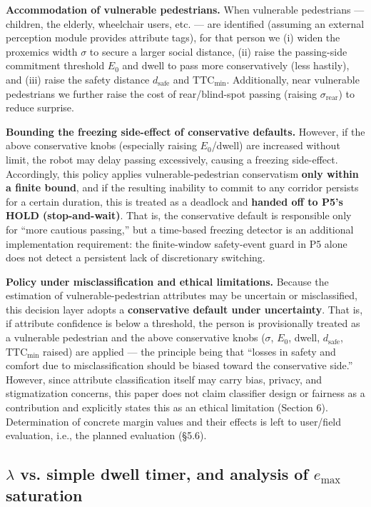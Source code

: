 \documentclass[11pt]{article}
\begin{document}
\textbf{Accommodation of vulnerable pedestrians.} When vulnerable pedestrians --- children, the elderly, wheelchair users, etc. --- are identified (assuming an external perception module provides attribute tags), for that person we (i) widen the proxemics width $\sigma$ to secure a larger social distance, (ii) raise the passing-side commitment threshold $E_0$ and dwell to pass more conservatively (less hastily), and (iii) raise the safety distance $d_{\text{safe}}$ and $\text{TTC}_{\min}$. Additionally, near vulnerable pedestrians we further raise the cost of rear/blind-spot passing (raising $\sigma_{\text{rear}}$) to reduce surprise.

\textbf{Bounding the freezing side-effect of conservative defaults.} However, if the above conservative knobs (especially raising $E_0$/dwell) are increased without limit, the robot may delay passing excessively, causing a freezing side-effect. Accordingly, this policy applies vulnerable-pedestrian conservatism \textbf{only within a finite bound}, and if the resulting inability to commit to any corridor persists for a certain duration, this is treated as a deadlock and \textbf{handed off to P5's HOLD (stop-and-wait)}. That is, the conservative default is responsible only for ``more cautious passing,'' but a time-based freezing detector is an additional implementation requirement: the finite-window safety-event guard in P5 alone does not detect a persistent lack of discretionary switching.

\textbf{Policy under misclassification and ethical limitations.} Because the estimation of vulnerable-pedestrian attributes may be uncertain or misclassified, this decision layer adopts a \textbf{conservative default under uncertainty}. That is, if attribute confidence is below a threshold, the person is provisionally treated as a vulnerable pedestrian and the above conservative knobs ($\sigma$, $E_0$, dwell, $d_{\text{safe}}$, $\text{TTC}_{\min}$ raised) are applied --- the principle being that ``losses in safety and comfort due to misclassification should be biased toward the conservative side.'' However, since attribute classification itself may carry bias, privacy, and stigmatization concerns, this paper does not claim classifier design or fairness as a contribution and explicitly states this as an ethical limitation (Section 6). Determination of concrete margin values and their effects is left to user/field evaluation, i.e., the planned evaluation (\S5.6).

\FloatBarrier
\subsection{$\lambda$ vs. simple dwell timer, and analysis of $e_{\max}$ saturation}
\end{document}
